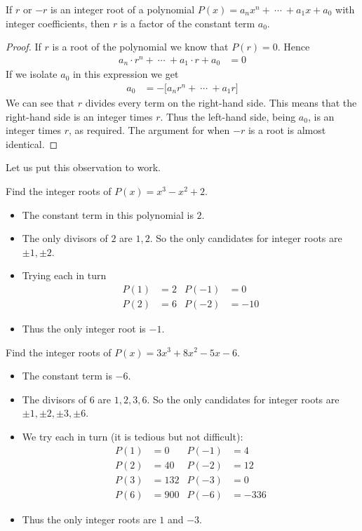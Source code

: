 \begin{trick}
If $r$ or $-r$ is an integer root of a polynomial
$P(x)=a_nx^n+\ \cdots\ +a_1x+a_0$ with integer coefficients, then $r$ is a factor
of the constant term $a_0$.
\end{trick}

\begin{proof}
If $r$ is a root of the polynomial we know that $P(r)=0$. Hence
\begin{align*}
  a_n \cdot r^n+\ \cdots\ +a_1\cdot r+a_0&=0
\end{align*}
If we isolate $a_0$ in this expression we get
\begin{align*}
  a_0 &=-\big[a_n r^n+\ \cdots\ +a_1r\big]
\end{align*}
We can see that $r$ divides every term on the right-hand side. This means that the
right-hand side is an integer times $r$. Thus the left-hand side, being $a_0$, is an
integer times $r$, as required. The argument for when $-r$ is a root is almost identical.
\end{proof}

Let us put this observation to work.
\begin{eg}
Find the integer roots of $P(x)=x^3-x^2+2$.

\soln
\begin{itemize}
 \item The constant term in this polynomial is $2$.
 \item The only divisors of $2$ are $1,2$. So the only candidates
for integer roots are $\pm 1, \pm 2$.
\item Trying each in turn
\begin{align*}
P(1)&=2 & P(-1)&=0 \\
P(2)&=6 & P(-2) &=-10
\end{align*}
\item Thus the only integer root is $-1$.
\end{itemize}
\end{eg}

\begin{eg}
 Find the integer roots of $P(x)= 3x^3+8x^2-5x-6$.

\soln
\begin{itemize}
 \item The constant term is $-6$.
\item The divisors of $6$ are $1,2,3,6$. So the only candidates for integer roots are
$\pm1, \pm 2, \pm 3, \pm 6$.
\item We try each in turn (it is tedious but not difficult):
\begin{align*}
  P(1) &= 0 & P(-1) &= 4 \\
  P(2) &= 40 & P(-2) &= 12\\
  P(3) &= 132 & P(-3) &= 0\\
  P(6) &= 900 & P(-6) &= -336
\end{align*}
\item Thus the only integer roots are $1$ and $-3$.
\end{itemize}
\end{eg}

